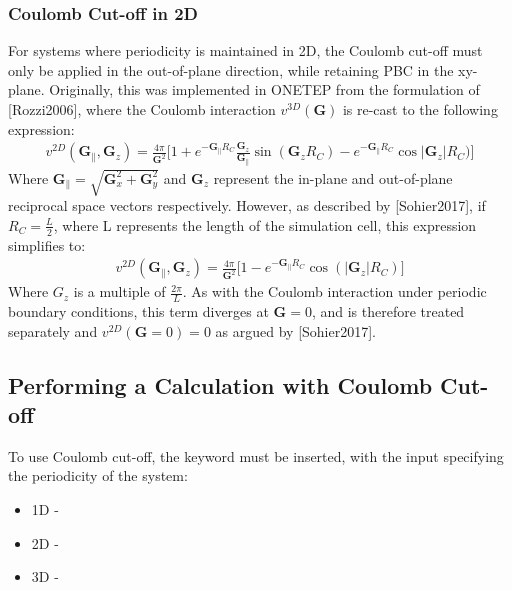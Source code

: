\documentclass[letterpaper,10pt,english]{sphinxmanual}
\begin{document}
\subsubsection{Coulomb Cut-off in 2D}
\label{\detokenize{cutoff_coulomb:coulomb-cut-off-in-2d}}
For systems where periodicity is maintained in 2D, the Coulomb cut-off
must only be applied in the out-of-plane direction, while retaining PBC
in the xy-plane. Originally, this was implemented in ONETEP from the
formulation of 
{[}Rozzi2006{]}, where the Coulomb
interaction \(v^{3D}(\mathbf{G})\) is re-cast to the following
expression:
\begin{equation*}
\begin{split}v^{2D}(\mathbf{G_{\|}},\mathbf{G}_{z}) = \frac{4 \pi}{\mathbf{G}^2} \bigg \lbrack 1 + e^{-\mathbf{G}_{\|}R_C}\frac{\mathbf{G}_z}{\mathbf{G}_{\|}}\sin(\mathbf{G}_z R_C) - e^{-\mathbf{G}_{\|}R_C}\cos{|\mathbf{G}_z|R_C}) \bigg \rbrack\end{split}
\end{equation*}
Where \(\mathbf{G}_{\|} = \sqrt{\mathbf{G}_{x}^2+\mathbf{G}_{y}^2}\)
and \(\mathbf{G}_{z}\) represent the in-plane and out-of-plane
reciprocal space vectors respectively. However, as described by  {[}Sohier2017{]}, if
\(R_C = \frac{L}{2}\), where L represents the length of the
simulation cell, this expression simplifies to:
\begin{equation*}
\begin{split}v^{2D}(\mathbf{\mathbf{G}_{\|}},\mathbf{G}_{z}) = \frac{4 \pi}{\mathbf{G}^2} \bigg \lbrack 1 - e^{-\mathbf{G}_{\|}R_C}\cos({|\mathbf{G}_z|R_C}) \bigg \rbrack\end{split}
\end{equation*}
Where \(G_z\) is a multiple of \(\frac{2 \pi}{L}\). As with the
Coulomb interaction under periodic boundary conditions, this term
diverges at \(\mathbf{G} = 0\), and is therefore treated separately
and \(v^{2D}(\mathbf{\mathbf{G}}=0) = 0\) as argued by  {[}Sohier2017{]}.


\subsection{Performing a Calculation with Coulomb Cut-off}
\label{\detokenize{cutoff_coulomb:performing-a-calculation-with-coulomb-cut-off}}
To use Coulomb cut-off, the keyword  must be
inserted, with the input specifying the periodicity of the system:
\begin{itemize}
\item {} 
1D - 

\item {} 
2D - 

\item {} 
3D - 

\end{itemize}
\end{document}
